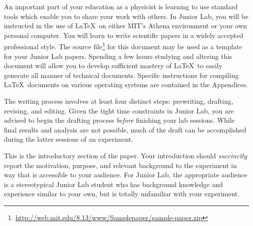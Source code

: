 \maketitle





An important part of your education as a physicist is learning to
use standard tools which enable you to share your work with others.
In Junior Lab, you will be instructed in the use of \LaTeX\ on 
either MIT's Athena environment or your own personal computer. You
will learn to write scientific papers in a widely accepted 
professional style. The source file\footnote{\url{http://web.mit.edu/8.13/www/Samplepaper/sample-paper.zip}}
for this document may be used as a template for your Junior Lab
papers. Spending a few hours studying and altering this document
will allow you to develop sufficient mastery of \LaTeX\ to easily
generate all manner of technical documents.  Specific instructions
for compiling \LaTeX\ documents on various operating systems are
contained in the Appendices.  

The writing
process \cite{owc_process}
involves at least four distinct steps: prewriting, drafting,
revising, and editing.  Given the tight time constraints in Junior
Lab, you are advised to begin the drafting process \emph{before}
finishing your lab sessions.  While final results and analysis are
not possible, much of the draft can be accomplished during the
latter sessions of an experiment.

This is the introductory section of the paper. Your introduction should 
\emph{succinctly} report the motivation, purpose, and relevant background
 to the experiment in way that is accessible to your audience. For Junior Lab, 
the appropriate audience is a stereotypical Junior Lab student who has 
background knowledge and experience similar to your own, but is totally 
unfamiliar with your experiment.


